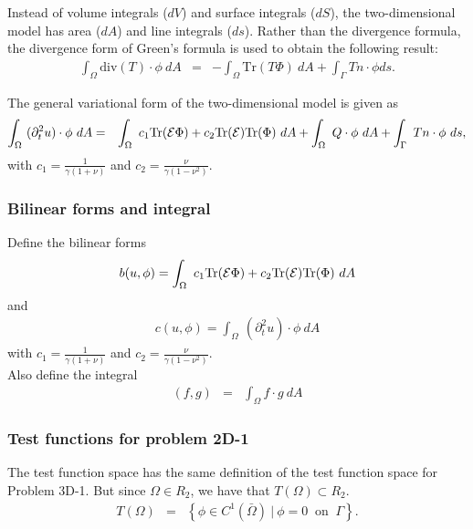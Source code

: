 \documentclass[../../main.tex]{subfiles}
\begin{document}
Instead of volume integrals ($dV$) and surface integrals ($dS$), the two-dimensional model has area ($dA$) and line integrals ($ds$). Rather than the divergence formula, the divergence form of Green's formula is used to obtain the following result:
\begin{eqnarray*}
	\int_{\Omega} \textrm{div}(T)\cdot \phi \ dA & = & -\int_{\Omega} \textrm{Tr}(T\Phi) \ dA + \int_{\Gamma} Tn\cdot \phi ds.
\end{eqnarray*}

The general variational form of the two-dimensional model is given as
\begin{eqnarray*}
	\int_\Omega~ (\partial^2_t u) \cdot \phi~dA & = & \int_\Omega~c_1\textrm{Tr}({\cal E}\Phi)+ c_2\textrm{Tr}({\cal E})
	\textrm{Tr}(\Phi) ~dA + \int_\Omega~ Q \cdot \phi~dA
	+ \int_\Gamma~Tn \cdot \phi~ds,
\end{eqnarray*}
with $\displaystyle c_1 = \frac{1}{\gamma(1+\nu)}$ and $\displaystyle c_2 = \frac{\nu}{\gamma(1-\nu^2)}$.

\subsubsection{Bilinear forms and integral}\label{sssec:2D_Model:BilinearForm}
Define the bilinear forms
\begin{eqnarray}
	b(u,\phi) = \int_\Omega~c_1\textrm{Tr}({\cal E}\Phi)+ c_2\textrm{Tr}({\cal E})
	\textrm{Tr}(\Phi) ~dA \label{eq:2D_Model:Bilinear}
\end{eqnarray}
and
\begin{eqnarray}
	c(u,\phi) = \int_\Omega~ (\partial^2_t u) \cdot \phi~dA \label{eq:2D_Model:Bilinear_c}
\end{eqnarray}
with $\displaystyle c_1 = \frac{1}{\gamma(1+\nu)}$ and $\displaystyle c_2 = \frac{\nu}{\gamma(1-\nu^2)}$.\\
Also define the integral
\begin{eqnarray}
	(f,g) &=& \int_{\Omega} f\cdot g \ dA \label{eq:2D_Model:Bilinear_int}
\end{eqnarray}

\subsubsection{Test functions for problem 2D-1}\label{sssec:2D_Model:TestFunctions2D1}
The test function space has the same definition of the test function space for Problem 3D-1. But since $\Omega \in R_2$, we have that $T(\Omega) \subset R_2$.
\begin{eqnarray*}
	T(\Omega) & = & \left\{ \phi \in C^1(\bar{\Omega}) \ | \ \phi = 0 \ \textrm{ on } \ \Gamma \right\}.
\end{eqnarray*}
\end{document}
